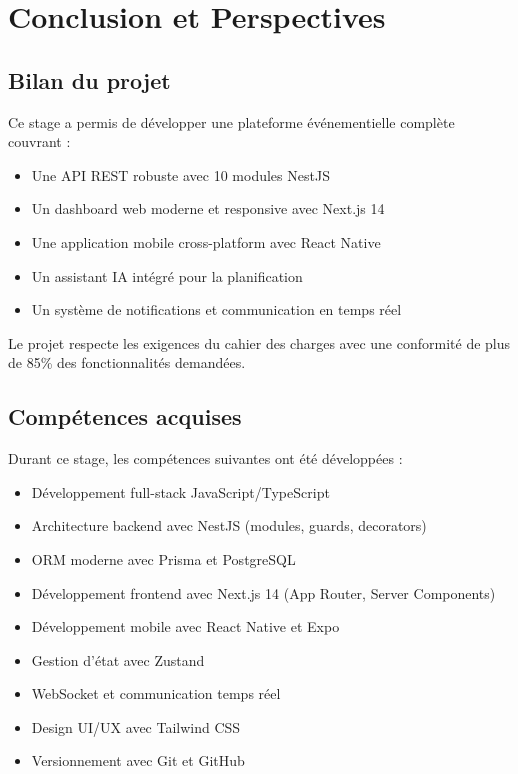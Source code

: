 \documentclass[12pt,a4paper]{report}
\begin{document}
\chapter{Conclusion et Perspectives}

\section{Bilan du projet}
Ce stage a permis de développer une plateforme événementielle complète couvrant :
\begin{itemize}
  \item Une API REST robuste avec 10 modules NestJS
  \item Un dashboard web moderne et responsive avec Next.js 14
  \item Une application mobile cross-platform avec React Native
  \item Un assistant IA intégré pour la planification
  \item Un système de notifications et communication en temps réel
\end{itemize}

Le projet respecte les exigences du cahier des charges avec une conformité de plus de 85\% des fonctionnalités demandées.

\section{Compétences acquises}
Durant ce stage, les compétences suivantes ont été développées :
\begin{itemize}
  \item Développement full-stack JavaScript/TypeScript
  \item Architecture backend avec NestJS (modules, guards, decorators)
  \item ORM moderne avec Prisma et PostgreSQL
  \item Développement frontend avec Next.js 14 (App Router, Server Components)
  \item Développement mobile avec React Native et Expo
  \item Gestion d'état avec Zustand
  \item WebSocket et communication temps réel
  \item Design UI/UX avec Tailwind CSS
  \item Versionnement avec Git et GitHub
\end{itemize}
\end{document}
